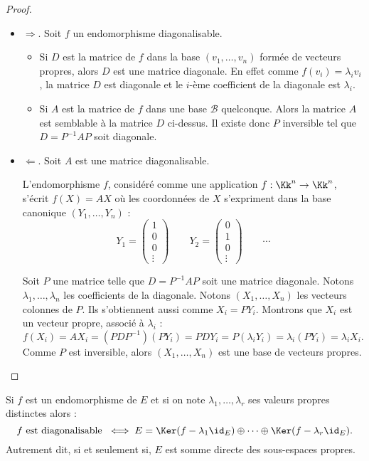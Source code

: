\documentclass[12pt, class=report,crop=false]{standalone}
\begin{document}
\begin{proof}~
\begin{itemize}
\item $\Longrightarrow$. Soit $f$ un endomorphisme diagonalisable.
\begin{itemize}
  \item Si $D$ est la matrice de $f$ dans la base $(v_1,\ldots,v_n)$ formée de vecteurs propres, alors
  $D$ est une matrice diagonale. En effet comme $f(v_i) = \lambda_i v_i$, la matrice $D$ est diagonale et le $i$-ème coefficient de la diagonale est $\lambda_i$.

  \item Si $A$ est la matrice de $f$ dans une base $\mathcal{B}$ quelconque. Alors la matrice $A$ est semblable à la matrice $D$ ci-dessus. Il existe donc $P$ inversible tel que $D = P^{-1}AP$ soit diagonale.
\end{itemize}

\item $\Longleftarrow$. Soit $A$ est une matrice diagonalisable.

L'endomorphisme $f$, considéré comme une application $f : \Kk^n \to \Kk^n$, s'écrit $f(X)=AX$ où les coordonnées de $X$ s'expriment dans la base canonique
$(Y_1,\ldots,Y_n)$ :
$$Y_1 = \left(\begin{smallmatrix}1\\0\\0\\\vdots\end{smallmatrix}\right) \qquad
Y_2 = \left(\begin{smallmatrix}0\\1\\0\\\vdots\end{smallmatrix}\right) \qquad \cdots$$

Soit $P$ une matrice telle que $D = P^{-1}AP$ soit une matrice diagonale. Notons
$\lambda_1,\ldots,\lambda_n$ les coefficients de la diagonale.
Notons $(X_1,\ldots,X_n)$ les vecteurs colonnes de $P$.
Ils s'obtiennent aussi comme $X_i = P Y_i$.
Montrons que $X_i$ est un vecteur propre, associé à $\lambda_i$ :
$$f(X_i) = AX_i = (PDP^{-1})(P Y_i) = PD Y_i = P (\lambda_i Y_i) = \lambda_i (P Y_i) = \lambda_i X_i.$$
Comme $P$ est inversible, alors $(X_1,\ldots,X_n)$ est une base de vecteurs propres.
\end{itemize}
\end{proof}



\begin{remarque*}
Si $f$ est un endomorphisme de $E$ et si on note $\lambda_1,\ldots,\lambda_r$ ses valeurs propres distinctes 
alors :
\[f \text{ est diagonalisable } \iff E = \Ker (f -\lambda_1\id_E) \oplus \cdots \oplus \Ker (f -\lambda_r\id_E).\] 
Autrement dit, si et seulement si, $E$ est somme directe des sous-espaces propres.
\end{remarque*}
\end{document}
